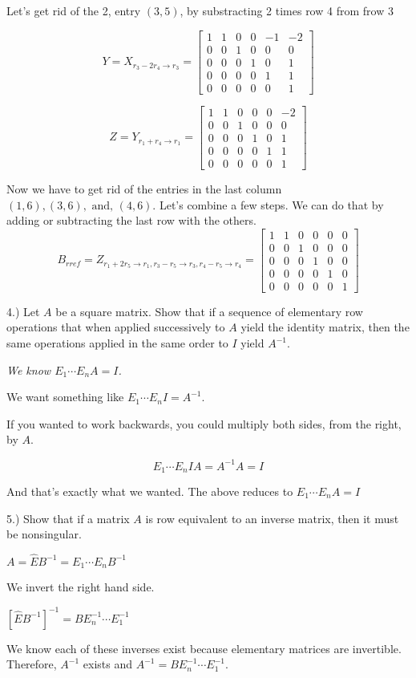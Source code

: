 \documentclass{article}
\begin{document}
Let's get rid of the 2, entry $(3,5)$, by substracting 2 times row 4 from frow 3

$$Y = X_{r_3-2r_4\rightarrow r_3} = \left[\begin{array}{cccccc}
1 & 1 & 0 & 0 & -1 & -2\\
0 & 0 & 1 & 0 & 0 & 0\\
0 & 0 & 0 & 1 & 0 & 1\\
0 & 0 & 0 & 0 & 1 & 1\\
0 & 0 & 0 & 0 & 0 & 1
\end{array}\right]$$ 

$$Z = Y_{r_1+r_4\rightarrow r_1} = \left[\begin{array}{cccccc}
1 & 1 & 0 & 0 & 0 & -2\\
0 & 0 & 1 & 0 & 0 & 0\\
0 & 0 & 0 & 1 & 0 & 1\\
0 & 0 & 0 & 0 & 1 & 1\\
0 & 0 & 0 & 0 & 0 & 1
\end{array}\right]$$ 

Now we have to get rid of the entries in the last column $(1,6), (3,6), \text{ and, } (4,6)$. Let's combine a few steps. We can do that by adding or subtracting the last row with the others.
$$B_{rref} = Z_{r_1+2r_5\rightarrow r_1,r_3-r_5\rightarrow r_3, r_4-r_5\rightarrow r_4 } = \left[\begin{array}{cccccc}
1 & 1 & 0 & 0 & 0 & 0\\
0 & 0 & 1 & 0 & 0 & 0\\
0 & 0 & 0 & 1 & 0 & 0\\
0 & 0 & 0 & 0 & 1 & 0\\
0 & 0 & 0 & 0 & 0 & 1
\end{array}\right]$$ 

\rm

\medskip{}

4.) Let $A$ be a square matrix. Show that if a sequence of elementary row operations that when applied successively to $A$ yield the identity matrix, then the same operations applied in the same order to $I$ yield $A^{-1}$.



\it
We know $E_1 \cdots E_n A = I$. 

We want something like $E_1 \cdots E_n I = A^{-1}$.

If you wanted to work backwards, you could multiply both sides, from the right, by $A$. 

$$E_1 \cdots E_n I A= A^{-1}A = I$$

And that's exactly what we wanted. The above reduces to $E_1 \cdots E_n  A=  I$

\rm

5.) Show that if a matrix $A$ is row equivalent to an inverse matrix, then it must be nonsingular.


\it

$A=\hat{E}B^{-1}=E_1\cdots E_n B^{-1}$

We invert the right hand side. 

$\left[\hat{E}B^{-1}\right]^{-1} = BE_n^{-1}\cdots E_1^{-1}$

We know each of these inverses exist because elementary matrices are invertible. Therefore, $A^{-1}$ exists and  $A^{-1}=BE_n^{-1}\cdots E_1^{-1}.$
\end{document}
